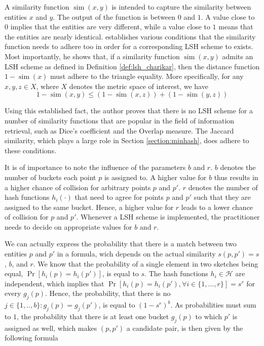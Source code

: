 A similarity function $\operatorname{sim}(x,y)$ is intended to capture the similarity between entities $x$ and $y$. The output of the function is between $0$ and $1$. A value close to $0$ implies that the entities are very different, while a value close to $1$ means that the entities are nearly identical.
\cite{Charikar02} establishes various conditions that the similarity function needs to adhere too in order for a corresponding LSH scheme to exists. Most importantly, he shows that, if a similarity function $\operatorname{sim}(x,y)$ admits an LSH scheme as defined in Definition \ref{def:lsh_charikar}, then the distance function $1 - \operatorname{sim}(x)$ must adhere to the triangle equality. More specifically, for any $x,y,z \in X$, where $X$ denotes the metric space of interest, we have
\begin{equation}
    1 - \operatorname{sim}(x,y) \leq (1 - \operatorname{sim}(x,z)) + (1 - \operatorname{sim}(y,z))
\label{eq:triangle_inequality}
\end{equation}

Using this established fact, the author proves that there is no LSH scheme for a number of similarity functions that are popular in the field of information retrieval, such as Dice's coefficient and the Overlap measure. The Jaccard similarity, which plays a large role in Section \ref{section:minhash}, does adhere to these conditions.

It is of importance to note the influence of the parameters $b$ and $r$. $b$ denotes the number of buckets each point $p$ is assigned to. A higher value for $b$ thus results in a higher chance of collision for arbitrary points $p$ and $p'$. $r$ denotes the number of hash functions $h_i(\cdot)$ that need to agree for points $p$ and $p'$ such that they are assigned to the same bucket. Hence, a higher value for $r$ leads to a lower chance of collision for $p$ and $p'$. Whenever a LSH scheme is implemented, the practitioner needs to decide on appropriate values for $b$ and $r$. 

We can actually express the probability that there is a match between two entities $p$ and $p'$ in a formula, wich depends on the actual similarity $s(p,p') = s$, $b$, and $r$. We know that the probability of a single element in two sketches being equal, $\operatorname{Pr}[h_i(p) = h_i(p')]$, is equal to $s$.  The hash functions $h_i\in\mathcal{H}$ are independent, which implies that $\operatorname{Pr}[h_i(p) = h_i(p'), \forall i \in \{1,...,r\}] = s^r$ for every $g_j(p)$. Hence, the probability, that there is no $j \in \{1,..,b\} : g_j(p)=g_j(p')$, is equal to $(1- s^r)^b$. As probabilities must sum to $1$, the probability that there is at least one bucket $g_j(p)$ to which $p'$ is assigned as well, which makes $(p, p')$ a candidate pair, is then given by the following formula

